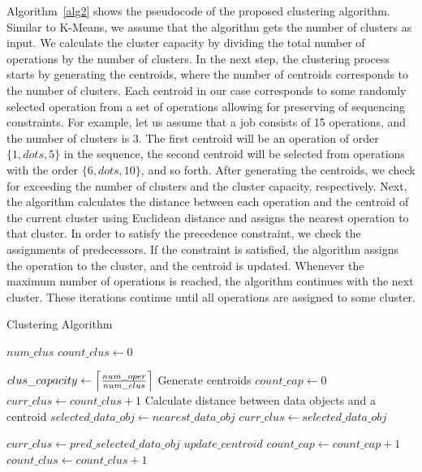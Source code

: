 \documentclass[runningheads]{llncs}
\DeclarePairedDelimiter\ceil{\lceil}{\rceil}
\begin{document}
Algorithm~\ref{alg2} shows the pseudocode of the proposed clustering algorithm. Similar to K-Means, we assume that the algorithm gets the number of clusters as input. We calculate the cluster capacity by dividing the total number of operations by the number of clusters. In the next step, the clustering process starts by generating the centroids, where the number of centroids corresponds to the number of clusters. Each centroid in our case corresponds to some randomly selected operation from a set of operations allowing for preserving of sequencing constraints. For example, let us assume that a job consists of 15 operations, and the number of clusters is $3$. The first centroid will be an operation of order $\{1, dots, 5\}$ in the sequence, the second centroid will be selected from operations with the order $\{6, dots, 10\}$, and so forth. After generating the centroids, we check for exceeding the number of clusters and the cluster capacity, respectively. 
%
Next, the algorithm calculates the distance between each operation and the centroid of the current cluster using Euclidean distance and assigns the nearest operation to that cluster. In order to satisfy the precedence constraint, we check the assignments of predecessors. If the constraint is satisfied, the algorithm assigns the operation to the cluster, and the centroid is updated. Whenever the maximum number of operations is reached, the algorithm continues with the next cluster. These iterations continue until all operations are assigned to some cluster. 

\begin{algorithm}
\caption{Clustering Algorithm}\label{alg2}
\begin{algorithmic}
\Require $num\_clus$
\State $count\_clus \gets 0$

\State $clus\_capacity \gets \ceil*{\frac{num\_oper}{num\_clus}}$
\State Generate centroids
    \State $count\_cap \gets 0$
    \State $curr\_clus \gets count\_clus + 1$
          \State Calculate distance between data objects and a centroid   
          \State $selected\_data\_obj \gets nearest\_data\_obj$
          \State $curr\_clus \gets selected\_data\_obj$    

               
              \State $curr\_clus \gets pred\_selected\_data\_obj$
          \EndIf
          \State $update\_centroid$
          \State $count\_cap \gets count\_cap + 1 $
	\EndWhile
    \State $count\_clus \gets count\_clus + 1 $
\EndWhile
\end{algorithmic}
\end{algorithm}
\end{document}
